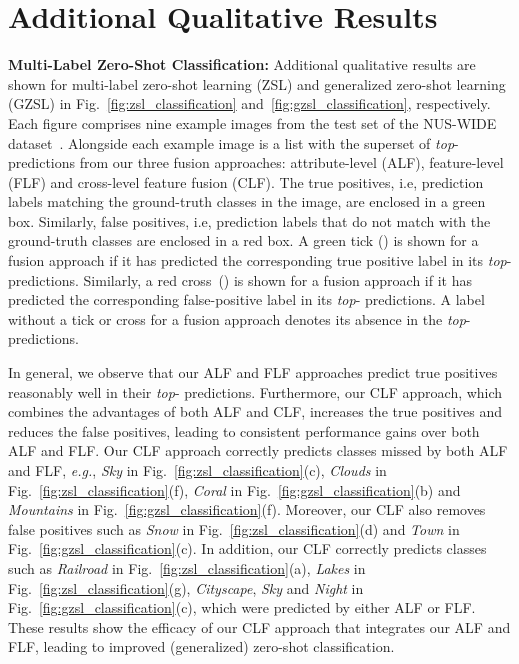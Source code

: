 \documentclass[10pt,journal,compsoc]{IEEEtran}
\newcommand{\xmark}{\ding{55}}
\begin{document}
\section{Additional Qualitative Results\label{sec:qual_res}}
\noindent\textbf{Multi-Label Zero-Shot Classification:} Additional qualitative results are shown for multi-label zero-shot learning (ZSL) and generalized zero-shot learning (GZSL) in Fig.~\ref{fig:zsl_classification} and~\ref{fig:gzsl_classification}, respectively. Each figure comprises nine example images from the test set of the NUS-WIDE dataset~\cite{nuswide}. Alongside each example image is a list with the superset of \textit{top}- predictions from our three fusion approaches: attribute-level (ALF), feature-level (FLF) and cross-level feature fusion (CLF). The true positives, i.e, prediction labels matching the ground-truth classes in the image, are enclosed in a green box. Similarly, false positives, i.e, prediction labels that do not match with the ground-truth classes are enclosed in a red box. A green tick ({\color{ForestGreen}}) is shown for a fusion approach if it has predicted the corresponding true positive label in its \textit{top}- predictions. Similarly, a red cross~({\color{red}\xmark}) is shown for a fusion approach if it has predicted the corresponding false-positive label in its \textit{top}- predictions. A label without a tick or cross for a fusion approach denotes its absence in the \textit{top}- predictions. 

In general, we observe that our ALF and FLF approaches predict true positives reasonably well in their \textit{top}- predictions. Furthermore, our CLF approach, which combines the advantages of both ALF and CLF, increases the true positives and reduces the false positives, leading to consistent performance gains over both ALF and FLF. Our CLF approach correctly predicts classes missed by both ALF and FLF, \textit{e.g.}, \textit{Sky} in Fig.~\ref{fig:zsl_classification}(c), \textit{Clouds} in Fig.~\ref{fig:zsl_classification}(f), \textit{Coral} in Fig.~\ref{fig:gzsl_classification}(b) and \textit{Mountains} in Fig.~\ref{fig:gzsl_classification}(f). Moreover, our CLF also removes false positives such as \textit{Snow} in Fig.~\ref{fig:zsl_classification}(d) and \textit{Town} in Fig.~\ref{fig:gzsl_classification}(c). In addition, our CLF correctly predicts classes such as \textit{Railroad} in Fig.~\ref{fig:zsl_classification}(a), \textit{Lakes} in Fig.~\ref{fig:zsl_classification}(g),  \textit{Cityscape}, \textit{Sky} and \textit{Night} in Fig.~\ref{fig:gzsl_classification}(c), which were predicted by either ALF or FLF. These results show the efficacy of our CLF approach that integrates our ALF and FLF, leading to improved (generalized) zero-shot classification. 
\end{document}
